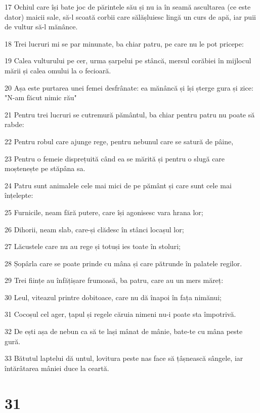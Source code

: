 \par 17 Ochiul care își bate joc de părintele său și nu ia în seamă ascultarea (ce este dator) maicii sale, să-l scoată corbii care sălășluiesc lingă un curs de apă, iar puii de vultur să-l mănânce.
\par 18 Trei lucruri mi se par minunate, ba chiar patru, pe care nu le pot pricepe:
\par 19 Calea vulturului pe cer, urma șarpelui pe stâncă, mersul corăbiei în mijlocul mării și calea omului la o fecioară.
\par 20 Așa este purtarea unei femei desfrânate: ea mănâncă și își șterge gura și zice: "N-am făcut nimic rău"
\par 21 Pentru trei lucruri se cutremură pământul, ba chiar pentru patru nu poate să rabde:
\par 22 Pentru robul care ajunge rege, pentru nebunul care se satură de pâine,
\par 23 Pentru o femeie disprețuită când ea se mărită și pentru o slugă care moștenește pe stăpâna sa.
\par 24 Patru sunt animalele cele mai mici de pe pământ și care sunt cele mai înțelepte:
\par 25 Furnicile, neam fără putere, care își agonisesc vara hrana lor;
\par 26 Dihorii, neam slab, care-și clădesc în stânci locașul lor;
\par 27 Lăcustele care nu au rege și totuși ies toate în stoluri;
\par 28 Șopârla care se poate prinde cu mâna și care pătrunde în palatele regilor.
\par 29 Trei ființe au înfățișare frumoasă, ba patru, care au un mers măreț:
\par 30 Leul, viteazul printre dobitoace, care nu dă înapoi în fața nimănui;
\par 31 Cocoșul cel ager, țapul și regele căruia nimeni nu-i poate sta împotrivă.
\par 32 De ești așa de nebun ca să te lași mânat de mânie, bate-te cu mâna peste gură.
\par 33 Bătutul laptelui dă untul, lovitura peste nas face să țâșnească sângele, iar întărâtarea mâniei duce la ceartă.

\chapter{31}

